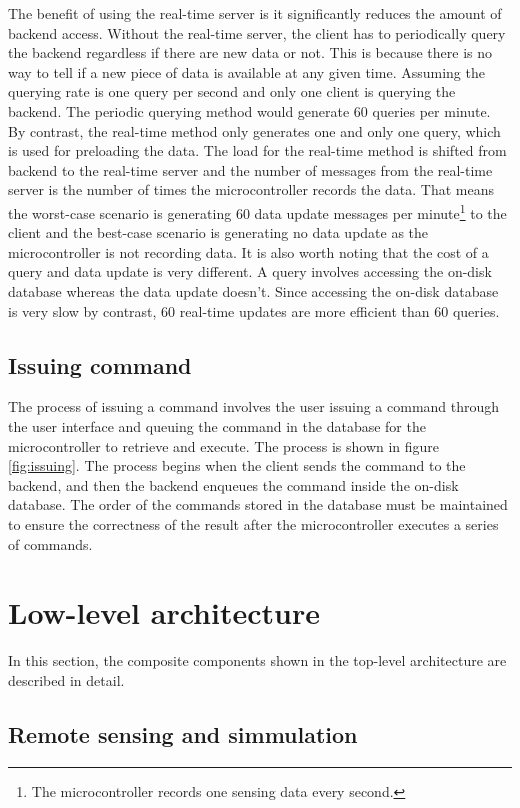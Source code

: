 \documentclass[../thesis.tex]{subfiles}
\begin{document}
The benefit of using the real-time server is it significantly reduces the amount of backend access. Without the real-time server, the client has to periodically query the backend regardless if there are new data or not. This is because there is no way to tell if a new piece of data is available at any given time. Assuming the querying rate is one query per second and only one client is querying the backend. The periodic querying method would generate 60 queries per minute. By contrast, the real-time method only generates one and only one query, which is used for preloading the data. The load for the real-time method is shifted from backend to the real-time server and the number of messages from the real-time server is the number of times the microcontroller records the data. That means the worst-case scenario is generating 60 data update messages per minute\footnote{The microcontroller records one sensing data every second.} to the client and the best-case scenario is generating no data update as the microcontroller is not recording data. It is also worth noting that the cost of a query and data update is very different. A query involves accessing the on-disk database whereas the data update doesn't. Since accessing the on-disk database is very slow by contrast, 60 real-time updates are more efficient than 60 queries.

\subsection{Issuing command}

The process of issuing a command involves the user issuing a command through the user interface and queuing the command in the database for the microcontroller to retrieve and execute. The process is shown in figure \ref{fig:issuing}. The process begins when the client sends the command to the backend, and then the backend enqueues the command inside the on-disk database. The order of the commands stored in the database must be maintained to ensure the correctness of the result after the microcontroller executes a series of commands.

\section{Low-level architecture}

In this section, the composite components shown in the top-level architecture are described in detail.

\subsection{Remote sensing and simmulation}
\label{sec:remoteSensing}
\label{sec:simulator}
\end{document}
